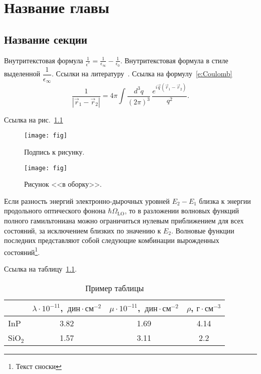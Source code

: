 \chapter{Название главы}
\section{Название секции}

Внутритекстовая формула $\frac{1}{\epsilon^*}=\frac{1}{\epsilon_\infty}-\frac{1}{\epsilon_0}$.
Внутритекстовая формула в стиле выделенной $\dfrac{1}{\epsilon_\infty}$.
Ссылки на литературу~\cite{Yoffe_1993_AP_42_173,Efros_1982_FTP_16_7_1209,%
Anselm_1978,Segall_1968,Agranovich_1983,InP,Mishchenko_1996,Skvortsov_2008,%
Perelman_2003_math:0307245,Nielsen_2010_1006.2735}. Ссылка на формулу~\eqref{e:Coulomb}
\begin{equation}\label{e:Coulomb}
  \frac{1}{|\vec r_1 - \vec r_2|} =
  4\pi \int \frac{d^3 q}{(2\pi)^3}\,
  \frac{e^{i\vec q(\vec r_1 - \vec r_2)}}{q^2}.
\end{equation}

Ссылка на рис.~\ref{f:fig}
\begin{figure}[!ht]
\centering
\texttt{[image: fig]}
\caption{\label{f:fig}%
Подпись к рисунку.
}
\end{figure}

\begin{wrapfigure}{r}{0.35\textwidth}
\centering
\texttt{[image: fig]}
\caption{\label{f:ff}%
Рисунок <<в оборку>>.
}
\end{wrapfigure}

Если разность энергий электронно-дырочных уровней $E_2-E_1$ близка к энергии продольного оптического фонона $\hbar\Omega_{\mathrm{LO}}$, то в разложении волновых функций полного гамильтониана можно ограничиться нулевым приближением для всех состояний, за исключением близких по значению к $E_2$.
Волновые функции последних представляют собой следующие комбинации вырожденных состояний\footnote{Текст сноски}.

Ссылка на таблицу~\ref{t:InPSiO2}.
\begin{table}[!ht]
  \centering
  \caption{Пример таблицы}\label{t:InPSiO2}
  \begin{tabular}{l|ccc}
    \hline\hline
    & \quad$\lambda \cdot 10^{-11}$,~$\text{дин}\cdot\text{см}^{-2}$
    & \quad$\mu \cdot 10^{-11}$,~$\text{дин}\cdot\text{см}^{-2}$
    & \quad$\rho$, $\text{г}\cdot\text{см}^{-3}$ \\
    \hline
    InP       & 3.82 & 1.69 & 4.14 \\
    SiO$_{2}$ & 1.57 & 3.11 & 2.2  \\
    \hline\hline
  \end{tabular}
\end{table}


